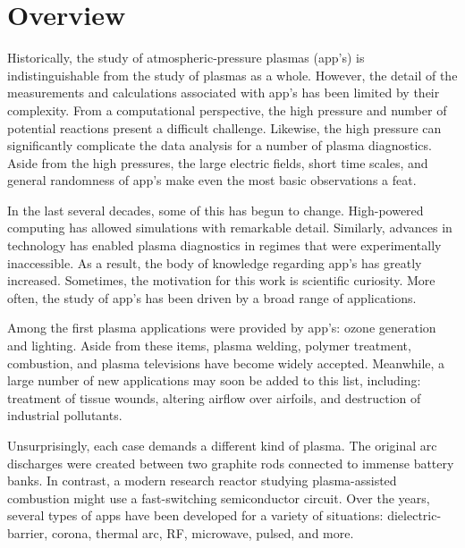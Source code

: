 \section{Overview}



Historically, the study of atmospheric-pressure plasmas (\acs{app}'s) is
indistinguishable from the study of plasmas as a whole. However, the detail of
the measurements and calculations associated with \acs{app}'s has been limited
by their complexity. From a computational perspective, the high pressure and
number of potential reactions present a difficult challenge. Likewise, the high
pressure can significantly complicate the data analysis for a number of plasma
diagnostics. Aside from the high pressures, the large electric fields, short
time scales, and general randomness of \acs{app}'s make even the most basic
observations a feat.


In the last several decades, some of this has begun to change. High-powered
computing has allowed simulations with remarkable detail. Similarly, advances in
technology has enabled plasma diagnostics in regimes that were experimentally
inaccessible. As a result, the body of knowledge regarding \acs{app}'s has
greatly increased. Sometimes, the motivation for this work is scientific
curiosity. More often, the study of \acs{app}'s has been driven by a broad range
of applications.

Among the first plasma applications were provided by \acs{app}'s: ozone
generation and lighting. Aside from these items, plasma welding, polymer
treatment, combustion, and plasma televisions have become widely accepted.
Meanwhile, a large number of new applications may soon be added to this list,
including: treatment of tissue wounds, altering airflow over airfoils, and
destruction of industrial pollutants.

Unsurprisingly, each case demands a different kind of plasma. The original arc
discharges were created between two graphite rods connected to immense battery
banks. In contrast, a modern research reactor studying plasma-assisted
combustion might use a fast-switching semiconductor circuit. Over the years,
several types of \acs{app}s have been developed for a variety of situations:
dielectric-barrier, corona, thermal arc, RF, microwave, pulsed, and more.


